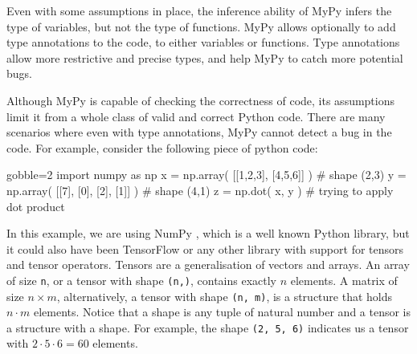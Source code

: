 
Even with some assumptions in place, the inference ability of MyPy infers the type of
variables, but not the type of functions. MyPy allows optionally to add type annotations
to the code, to either variables or functions. Type annotations allow more restrictive and
precise types, and help MyPy to catch more potential bugs.

Although MyPy is capable of checking the correctness of code, its assumptions limit it from a whole class of valid and correct
Python code\footnotemark. There are many scenarios where even with type annotations, MyPy
cannot detect a bug in the code. For example, consider the following piece of python
code:%



\begin{pythoncode*}{gobble=2}
  import numpy as np
  x = np.array( [[1,2,3], [4,5,6]] ) # shape (2,3)
  y = np.array( [[7], [0], [2], [1]] ) # shape (4,1)
  z = np.dot( x, y ) # trying to apply dot product
\end{pythoncode*}

In this example, we are using NumPy \autocite{oliphant2006guide}, which is a well known
Python library, but it could also have been TensorFlow \autocite{abadi_tensorflow_2016} or
any other library with support for tensors and tensor operators. Tensors are a
generalisation of vectors and arrays.  An array of size \texttt{n}, or a tensor with shape
\texttt{(n,)}, contains exactly \(n\) elements. A matrix of size \(n \times m\),
alternatively, a tensor with shape \texttt{(n,\ m)}, is a structure that holds
\(n \cdot m\) elements. Notice that a shape is any tuple of natural number and a tensor is
a structure with a shape. For example, the shape \texttt{(2,\ 5,\ 6)} indicates us a
tensor with \(2 \cdot 5 \cdot 6 = 60\) elements.

